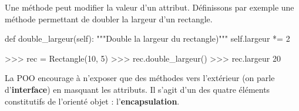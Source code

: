 \documentclass[
  a4paper,
  DIV=11,
  numbers=noendperiod]{scrartcl}
\newenvironment{Shaded}{\begin{snugshade}}{\end{snugshade}}
\newcommand{\CommentTok}[1]{\textcolor[rgb]{0.37,0.37,0.37}{#1}}
\newcommand{\DecValTok}[1]{\textcolor[rgb]{0.68,0.00,0.00}{#1}}
\newcommand{\KeywordTok}[1]{\textcolor[rgb]{0.00,0.23,0.31}{#1}}
\newcommand{\NormalTok}[1]{\textcolor[rgb]{0.00,0.23,0.31}{#1}}
\newcommand{\OperatorTok}[1]{\textcolor[rgb]{0.37,0.37,0.37}{#1}}
\newcommand{\VariableTok}[1]{\textcolor[rgb]{0.07,0.07,0.07}{#1}}
\begin{document}
Une méthode peut modifier la valeur d'un attribut. Définissons par
exemple une méthode permettant de doubler la largeur d'un rectangle.

\begin{Shaded}
\begin{Highlighting}[]
\KeywordTok{def}\NormalTok{ double\_largeur(}\VariableTok{self}\NormalTok{):}
    \CommentTok{"""Double la largeur du rectangle)"""}
    \VariableTok{self}\NormalTok{.largeur }\OperatorTok{*=} \DecValTok{2}
\end{Highlighting}
\end{Shaded}

\begin{Shaded}
\begin{Highlighting}[]
\OperatorTok{\textgreater{}\textgreater{}\textgreater{}}\NormalTok{ rec }\OperatorTok{=}\NormalTok{ Rectangle(}\DecValTok{10}\NormalTok{, }\DecValTok{5}\NormalTok{)}
\OperatorTok{\textgreater{}\textgreater{}\textgreater{}}\NormalTok{ rec.double\_largeur()}
\OperatorTok{\textgreater{}\textgreater{}\textgreater{}}\NormalTok{ rec.largeur}
\DecValTok{20}
\end{Highlighting}
\end{Shaded}

La POO encourage à n'exposer que des méthodes vers l'extérieur (on parle
d'\textbf{interface}) en masquant les attributs. Il s'agit d'un des
quatre éléments constitutifs de l'orienté objet :
l'\textbf{encapsulation}.
\end{document}

